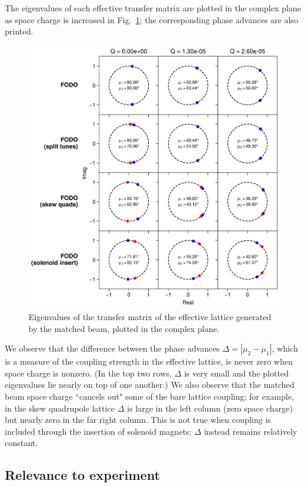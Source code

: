 The eigenvalues of each effective transfer matrix are plotted in the complex plane as space charge is increased in Fig.~\ref{fig:effective_transfer_matrix_eigvals}; the corresponding phase advances are also printed.
%
\begin{figure}[!p]
    \centering
    \includegraphics[width=\textwidth]{Images/chapter2/eigvals.png}
    \caption{Eigenvalues of the transfer matrix of the effective lattice generated by the matched beam, plotted in the complex plane.}
    \label{fig:effective_transfer_matrix_eigvals}
\end{figure}
%
We observe that the difference between the phase advances $\Delta = |\mu_2 - \mu_1|$, which is a measure of the coupling strength in the effective lattice, is never zero when space charge is nonzero. (In the top two rows, $\Delta$ is very small and the plotted eigenvalues lie nearly on top of one another.) We also observe that the matched beam space charge ``cancels out" some of the bare lattice coupling; for example, in the skew quadrupole lattice $\Delta$ is large in the left column (zero space charge) but nearly zero in the far right column. This is not true when coupling is included through the insertion of solenoid magnets; $\Delta$ instead remains relatively constant.  


\subsection{Relevance to experiment}


